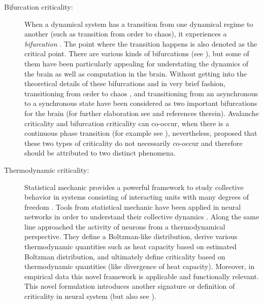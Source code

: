 \begin{description}
\item[Bifurcation criticality:]
  When a dynamical system has a transition from one dynamical regime to another
  (such as transition from order to chaos),
  it experiences a \emph{bifurcation} \cite{izhikevichDynamicalSystemsNeuroscience2010,breakspearDynamicModelsLargescale2017,cocchiCriticalityBrainSynthesis2017}.
  The point where the transition happens is also denoted as the critical point.
  There are various kinds of bifurcations (see \citet{izhikevichDynamicalSystemsNeuroscience2010}),
  but some of them have been particularly appealing for understating the dynamics of the brain as well as computation in the brain.
  Without getting into the theoretical details of these bifurcations and in very brief fashion,
  transitioning from order to chaos \cite{bertschingerRealtimeComputationEdge2004},
  and transitioning from an asynchronous to a synchronous state \cite{santoLandauGinzburgTheory2018}
  have been considered as two important bifurcations for the brain
  (for further elaboration see \citet{cocchiCriticalityBrainSynthesis2017,munozColloquiumCriticalityDynamical2018} and references therein).
  Avalanche criticality and bifurcation criticality can co-occur,
  when there is a continuous phase transition \cite{cocchiCriticalityBrainSynthesis2017}
  (for example see \cite{magnascoSelftunedCriticalAntiHebbian2009,pittorinoChaosCorrelatedAvalanches2017}),
  nevertheless, \citet{kandersAvalancheEdgeofchaosCriticality2017} 
  proposed that these two types of criticality do not necessarily co-occur and therefore should be attributed to two distinct phenomena.

\item[Thermodynamic criticality:]
  Statistical mechanic provides a powerful framework to study collective behavior in systems consisting of interacting units with many degrees of freedom \cite{sethnaStatisticalMechanicsEntropy2006}.
  Tools from statistical mechanic have been applied in neural networks in order to understand their collective dynamics \cite{amitModelingBrainFunction1992}.
  Along the same line \citet{tkacikThermodynamicsSignaturesCriticality2015} approached the activity of neurons from a thermodynamical perspective.
  They define a Boltzman-like distribution, derive various thermodynamic quantities such as heat capacity based on estimated Boltzman distribution, and ultimately define criticality based on thermodynamic quantities (like divergence of heat capacity).
  Moreover, in empirical data this novel framework is applicable and functionally relevant.
  This novel formulation introduces another signature or definition of criticality in neural system \cite{tkacikThermodynamicsSignaturesCriticality2015}
  (but also see \cite{nonnenmacherSignaturesCriticalityArise2017}).
\end{description}

